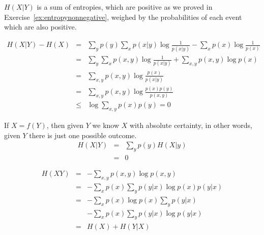 \begin{solution}
$H({X}|{Y})$ is a sum of entropies, which are positive as we proved in Exercise~\ref{ex:entropynonnegative}, weighed by the probabilities of each event which are also positive.
\end{solution}
\begin{solution}
\begin{eqnarray}
H({X}|{Y}) - H({X}) &=& \sum_{y }p(y) \sum_{x} p(x|y)\log \frac{1}{p(x|y)} - \sum_{x}p(x) \log  \frac{1}{p(x)}\nonumber \\
                         &=& \sum_{y}\sum_{x}p(x,y) \log \frac{1}{p(x|y)} + \sum_{x,y}p(x,y) \log  p(x) \nonumber \\
                         &=& \sum_{x,y}p(x,y) \log  \frac{p(x)}{p(x|y)} \nonumber \\
                         &=& \sum_{x,y}p(x,y) \log  \frac{p(x)p(y)}{p(x,y)} \nonumber \\
                         &\leq & \log \sum_{x,y} p(x) p(y) = 0
\end{eqnarray}
\end{solution}
\begin{solution}

If ${X}=f({Y})$, then given ${Y}$ we know ${X}$ with absolute certainty, in other words, given ${Y}$ there is just one possible outcome.
\begin{eqnarray}
H({X}|{Y})&=&\sum_{y}p(y) H({X}|y)\nonumber\\
         &=& 0
\end{eqnarray}
\end{solution}
\begin{solution}
\begin{eqnarray}
H({XY}) &=& - \sum_{x,y} p(x,y)\log p(x,y) \nonumber \\
       &=& - \sum_{x}p(x)\sum_{y} p(y|x)\log p(x)p(y|x) \nonumber \\
       &=& - \sum_{x}p(x)\log p(x)\sum_{y} p(y|x) \nonumber \\
       & & - \sum_{x}p(x)\sum_{y} p(y|x)\log p(y|x) \nonumber \\
       &=& H({X}) + H({Y}|{X})
\end{eqnarray}
\end{solution}
